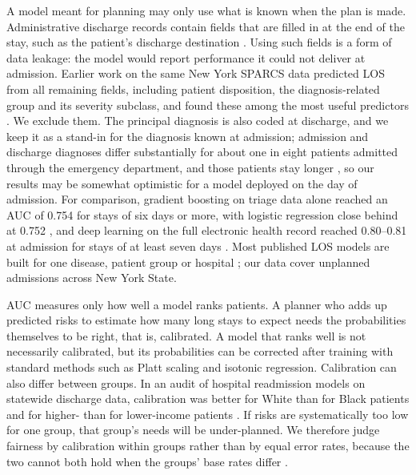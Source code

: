 \documentclass{article}
\begin{document}
A model meant for planning may only use what is known when the plan is made.
Administrative discharge records contain fields that are filled in at the end
of the stay, such as the patient's discharge destination \citep{sparcs}.
Using such fields is a form of data leakage: the model would report
performance it could not deliver at admission.
Earlier work on the same New York SPARCS data predicted LOS from all
remaining fields, including patient disposition, the diagnosis-related group
and its severity subclass, and found these among the most useful predictors
\citep{jain2024}. We exclude them. The principal diagnosis is also coded at
discharge, and we keep it as a stand-in for the diagnosis known at admission;
admission and discharge diagnoses differ substantially for about one in eight
patients admitted through the emergency department, and those patients stay
longer \citep{hautz2019}, so our results may be somewhat optimistic for a
model deployed on the day of admission. For comparison, gradient boosting on
triage data alone reached an AUC of 0.754 for stays of six days or more, with
logistic regression close behind at 0.752 \citep{zeleke2023}, and deep
learning on the full electronic health record reached 0.80--0.81 at
admission for stays of at least seven days \citep{rajkomar2018}. Most
published LOS models are built for one disease, patient group or hospital
\citep{stone2022}; our data cover unplanned admissions across New York State.

AUC measures only how well a model ranks patients. A planner who adds up
predicted risks to estimate how many long stays to expect needs the
probabilities themselves to be right, that is, calibrated. A model that ranks
well is not necessarily calibrated, but its probabilities can be corrected
after training with standard methods such as Platt scaling and isotonic
regression. Calibration
can also differ between groups. In an audit of hospital readmission models
on statewide discharge data, calibration was better for White than for Black
patients and for higher- than for lower-income patients \citep{wang2024}. If
risks are systematically too low for one group, that group's needs will be
under-planned. We therefore judge fairness by calibration within groups
rather than by equal error rates, because the two cannot both hold when the
groups' base rates differ \citep{kleinberg2017}.
\end{document}
